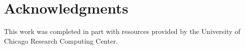 \documentclass[11pt]{article}
\numberwithin{equation}{section}
\numberwithin{theorem}{section}
\begin{document}
\title{}
\author{}
\date{First draft: ...}


\maketitle

\begin{abstract}

\end{abstract}



\newpage


\section*{Acknowledgments}

This work was completed in part with resources provided by the
University of Chicago Research Computing Center.



{


}


\appendix
\end{document}
